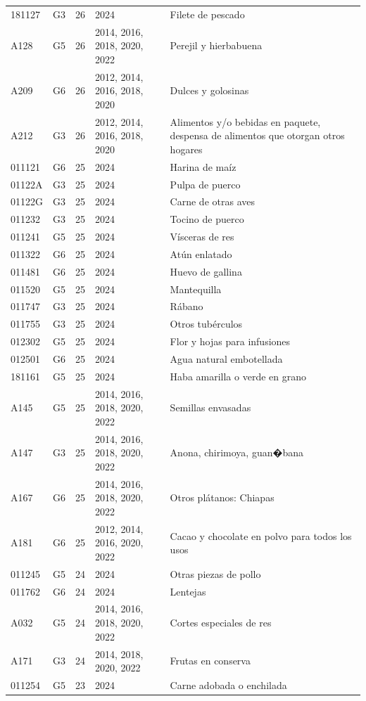 \begin{table}[ht]
\begin{tabular}{llrll}
  181127 & G3 &  26 & 2024 & Filete de pescado \\ 
  A128 & G5 &  26 & 2014, 2016, 2018, 2020, 2022 & Perejil y hierbabuena \\ 
  A209 & G6 &  26 & 2012, 2014, 2016, 2018, 2020 & Dulces y golosinas \\ 
  A212 & G3 &  26 & 2012, 2014, 2016, 2018, 2020 & Alimentos y/o bebidas en paquete, despensa de alimentos que otorgan otros hogares \\ 
  011121 & G6 &  25 & 2024 & Harina de maíz \\ 
  01122A & G3 &  25 & 2024 & Pulpa de puerco \\ 
  01122G & G3 &  25 & 2024 & Carne de otras aves \\ 
  011232 & G3 &  25 & 2024 & Tocino de puerco \\ 
  011241 & G5 &  25 & 2024 & Vísceras de res \\ 
  011322 & G6 &  25 & 2024 & Atún enlatado \\ 
  011481 & G6 &  25 & 2024 & Huevo de gallina \\ 
  011520 & G5 &  25 & 2024 & Mantequilla \\ 
  011747 & G3 &  25 & 2024 & Rábano \\ 
  011755 & G3 &  25 & 2024 & Otros tubérculos \\ 
  012302 & G5 &  25 & 2024 & Flor y hojas para infusiones \\ 
  012501 & G6 &  25 & 2024 & Agua natural embotellada \\ 
  181161 & G5 &  25 & 2024 & Haba amarilla o verde en grano \\ 
  A145 & G5 &  25 & 2014, 2016, 2018, 2020, 2022 & Semillas envasadas \\ 
  A147 & G3 &  25 & 2014, 2016, 2018, 2020, 2022 & Anona, chirimoya, guan�bana \\ 
  A167 & G6 &  25 & 2014, 2016, 2018, 2020, 2022 & Otros plátanos: Chiapas \\ 
  A181 & G6 &  25 & 2012, 2014, 2016, 2020, 2022 & Cacao y chocolate en polvo para todos los usos \\ 
  011245 & G5 &  24 & 2024 & Otras piezas de pollo \\ 
  011762 & G6 &  24 & 2024 & Lentejas \\ 
  A032 & G5 &  24 & 2014, 2016, 2018, 2020, 2022 & Cortes especiales de res \\ 
  A171 & G3 &  24 & 2014, 2018, 2020, 2022 & Frutas en conserva \\ 
  011254 & G5 &  23 & 2024 & Carne adobada o enchilada \\ 

\end{tabular}
\end{table}
